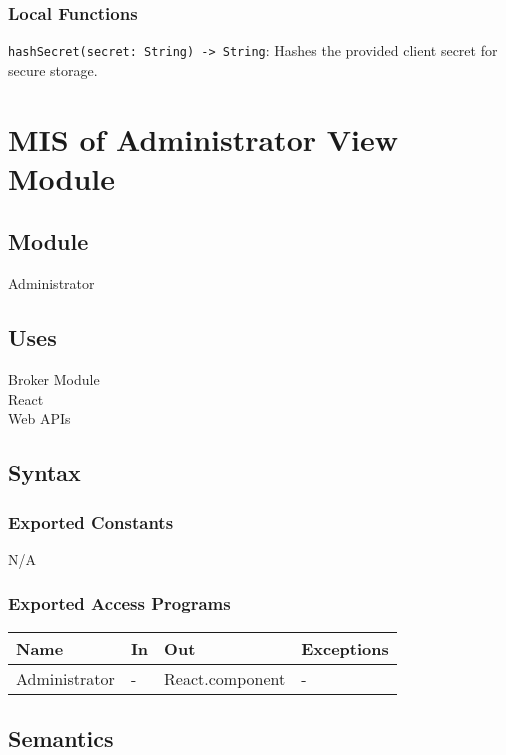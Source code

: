 \documentclass[12pt, titlepage]{article}
\begin{document}
\subsubsection{Local Functions}

\texttt{hashSecret(secret: String) -> String}: Hashes the provided client secret for secure storage.

\newpage


\section{MIS of Administrator View Module} \label{administrator_view_module}

\subsection{Module}
Administrator

\subsection{Uses}
Broker Module \\
React\\
Web APIs\\

\subsection{Syntax}

\subsubsection{Exported Constants}
N/A

\subsubsection{Exported Access Programs}

\begin{center}
\begin{tabular}{p{2cm} p{4cm} p{4cm} p{2cm}}
\hline
\textbf{Name} & \textbf{In} & \textbf{Out} & \textbf{Exceptions} \\
\hline
Administrator & - & React.component & - \\
\hline
\end{tabular}
\end{center}

\subsection{Semantics}
\end{document}
